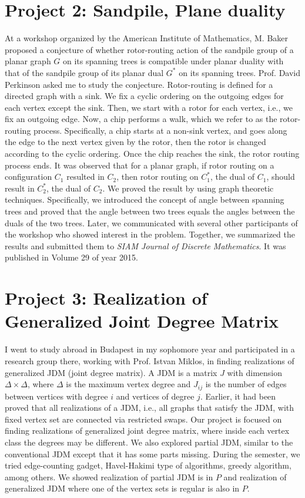 \documentclass[psamsfonts,reqno]{amsart}
\theoremstyle{definition}
\begin{document}
\section*{Project 2: Sandpile, Plane duality}

At a workshop organized by the American Institute of Mathematics, M. Baker proposed a conjecture of whether rotor-routing action of the sandpile group of a planar graph $G$ on its spanning trees is compatible under planar duality with that of the sandpile group of its planar dual $G^*$ on its spanning trees. Prof. David Perkinson asked me to study the conjecture. Rotor-routing is defined for a directed graph with a sink. We fix a cyclic ordering on the outgoing edges for each vertex except the sink. Then, we start with a rotor for each vertex, i.e., we fix an outgoing edge. Now, a chip performs a walk, which we refer to as the rotor-routing process. Specifically, a chip starts at a non-sink vertex, and goes along the edge to the next vertex given by the rotor, then the rotor is changed according to the cyclic ordering. Once the chip reaches the sink, the rotor routing process ends. It was observed that for a planar graph, if rotor routing on a configuration $C_1$ resulted in $C_2$, then rotor routing on $C_1^*$, the dual of $C_1$, should result in $C_2^*$, the dual of $C_2$. We proved the result by using graph theoretic techniques. Specifically, we introduced the concept of angle between spanning trees and proved that the angle between two trees equals the angles between the duals of the two trees. Later, we communicated with several other participants of the workshop who showed interest in the problem. Together, we summarized the results and submitted them to {\textit{SIAM Journal of Discrete Mathematics}}. It was published in Volume 29 of year 2015.

\section*{Project 3: Realization of Generalized Joint Degree Matrix}

I went to study abroad in Budapest in my sophomore year and participated in a research group there, working with Prof. Istvan Miklos, in finding realizations of generalized JDM (joint degree matrix). A JDM is a matrix $J$ with dimension $\Delta \times \Delta$, where $\Delta$ is the maximum vertex degree and $J_{ij}$ is the number of edges between vertices with degree $i$ and vertices of degree $j$. Earlier, it had been proved that all realizations of a JDM, i.e., all graphs that satisfy the JDM, with fixed vertex set are connected via restricted swaps. Our project is focused on finding realizations of generalized joint degree matrix, where inside each vertex class the degrees may be different. We also explored partial JDM, similar to the conventional JDM except that it has some parts missing. During the semester, we tried edge-counting gadget, Havel-Hakimi type of algorithms, greedy algorithm, among others. We showed realization of partial JDM is in $P$ and realization of generalized JDM where one of the vertex sets is regular is also in $P$.
\end{document}

